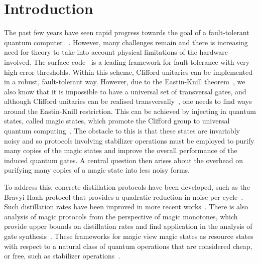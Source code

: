 \documentclass[pra,
aps,
twocolumn,
superscriptaddress,
groupedaddress,
nofootinbib,
reprint
]{revtex4-1}
\begin{document}
\section{Introduction}
\label{sec:intro}

The past few years have seen rapid progress towards the goal of a fault-tolerant quantum computer~\cite{Fowler_2012, Herrera_2010, Nickerson_2014, Nikahd_2017, chao_2018, lin_pieceable_2020, Lin_2020, Bourassa_2021} . However, many challenges remain and there is increasing need for theory to take into account physical limitations of the hardware involved. The surface code~\cite{Bravyi_1998, Freedman_2001, Dennis_2002, Raussendorf_2007} is a leading framework for fault-tolerance with very high error thresholds. Within this scheme, Clifford unitaries can be implemented in a robust, fault-tolerant way. However, due to the Eastin-Knill theorem~\cite{Eastin_2009}, we also know that it is impossible to have a universal set of transversal gates, and although Clifford unitaries can be realised transversally~\cite{Calderbank_1996, Steane_1996}, one needs to find ways around the Eastin-Knill restriction. This can be achieved by injecting in quantum states, called magic states, which promote the Clifford group to universal quantum computing~\cite{cit:bravyi}. The obstacle to this is that these states are invariably noisy and so protocols involving stabilizer operations must be employed to purify many copies of the magic states and improve the overall performance of the induced quantum gates. A central question then arises about the overhead on purifying many copies of a magic state into less noisy forms. 

To address this, concrete distillation protocols have been developed, such as the Bravyi-Haah protocol that provides a quadratic reduction in noise per cycle~\cite{Bravyi2012}. Such distillation rates have been improved in more recent works~\cite{Hastings2018, Litinski_2019, Krishna2019, cit:prakash}. There is also analysis of magic protocols from the perspective of magic monotones, which provide upper bounds on distillation rates and find application in the analysis of gate synthesis~\cite{Campbell_2017, Howard_2017, Prakash_2018}. These frameworks for magic view magic states as resource states with respect to a natural class of quantum operations that are considered cheap, or free, such as stabilizer operations~\cite{Gour_2019, cit:ahmadi, cit:seddon, Wang_2019}.
  
\end{document}
